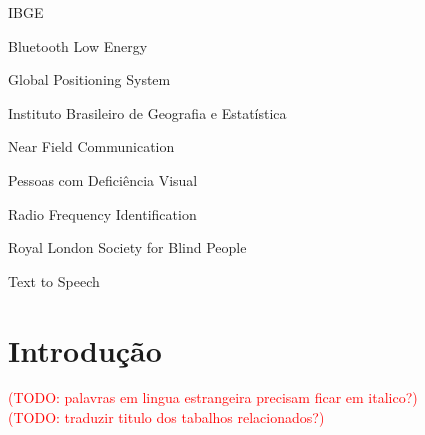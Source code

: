 \documentclass[english,brazilian]{UNISINOSmonografia}
\begin{document}
\begin{listadesiglas}{IBGE}
\item[BLE] Bluetooth Low Energy
\item[GPS] Global Positioning System
\item[IBGE] Instituto Brasileiro de Geografia e Estatística
\item[NFC] Near Field Communication
\item[PDV] Pessoas com Deficiência Visual
\item[RFID] Radio Frequency Identification
\item[RLSB]	Royal London Society for Blind People
\item[TTS] Text to Speech
\end{listadesiglas}

\tableofcontents

\chapter{Introdução} %

\textcolor{red}{
(TODO: palavras em lingua estrangeira precisam ficar em italico?) \\
(TODO: traduzir titulo dos tabalhos relacionados?) 
}
\end{document}
